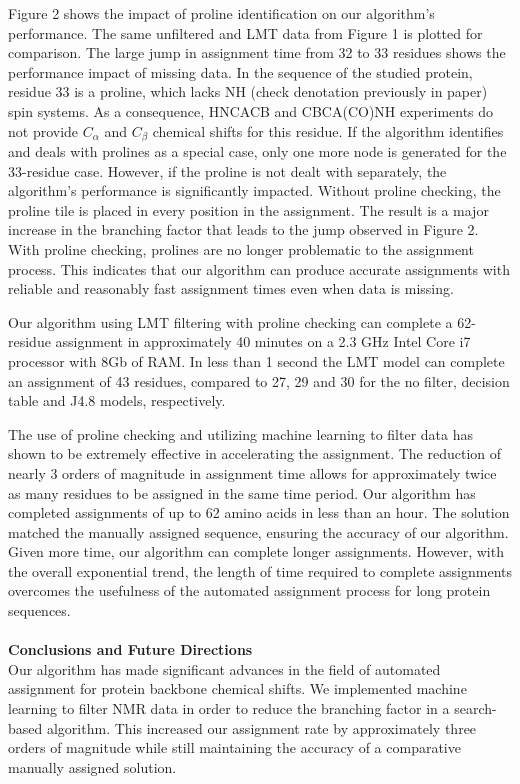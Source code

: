 \documentclass{article}
\begin{document}


Figure 2 shows the impact of proline identification on our algorithm’s performance. The same unfiltered and LMT data from Figure 1 is plotted for comparison. The large jump in assignment time from 32 to 33 residues shows the performance impact of missing data. In the sequence of the studied protein, residue 33 is a proline, which lacks NH (check denotation previously in paper) spin systems. As a consequence, HNCACB and CBCA(CO)NH experiments do not provide $C_\alpha$ and $C_\beta$ chemical shifts for this residue. If the algorithm identifies and deals with prolines as a special case, only one more node is generated for the 33-residue case. However, if the proline is not dealt with separately, the algorithm’s performance is significantly impacted. Without proline checking, the proline tile is placed in every position in the assignment. The result is a major increase in the branching factor that leads to the jump observed in Figure 2. With proline checking, prolines are no longer problematic to the assignment process. This indicates that our algorithm can produce accurate assignments with reliable and reasonably fast assignment times even when data is missing. 

Our algorithm using LMT filtering with proline checking can complete a 62-residue assignment in approximately 40 minutes on a 2.3 GHz Intel Core i7 processor with 8Gb of RAM. In less than 1 second the LMT model can complete an assignment of 43 residues, compared to 27, 29 and 30 for the no filter, decision table and J4.8 models, respectively. 

The use of proline checking and utilizing machine learning to filter data has shown to be extremely effective in accelerating the assignment. The reduction of nearly 3 orders of magnitude in assignment time allows for approximately twice as many residues to be assigned in the same time period. Our algorithm has completed assignments of up to 62 amino acids in less than an hour. The solution matched the manually assigned sequence, ensuring the accuracy of our algorithm. Given more time, our algorithm can complete longer assignments. However, with the overall exponential trend, the length of time required to complete assignments overcomes the usefulness of the automated assignment process for long protein sequences.
\\\\
\noindent\textbf {Conclusions and Future Directions}\\
Our algorithm has made significant advances in the field of automated assignment for protein backbone chemical shifts. We implemented machine learning to filter NMR data in order to reduce the branching factor in a search-based algorithm. This increased our assignment rate by approximately three orders of magnitude while still maintaining the accuracy of a comparative manually assigned solution.
\end{document}
